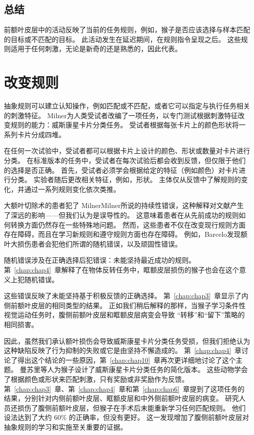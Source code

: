 \subsection{总结}
\par
前额叶皮层中的活动反映了当前的任务规则，例如，猴子是否应该选择与样本匹配的目标或不匹配的目标。
此活动发生在延迟期间，在规则指令呈现之后。
这些规则适用于任何刺激，无论是新奇的还是熟悉的，因此代表。



\section{改变规则}
\par
抽象规则可以建立认知操作，例如匹配或不匹配，或者它可以指定与执行任务相关的刺激特征。 
Milner\cite{milner1963effects}为人类受试者改编了一项任务，以专门测试根据刺激特征改变规则的能力：威斯康星卡片分类任务。 
受试者根据每张卡片上的颜色形状将一系列卡片分成四堆。
\par


在任何一次试验中，受试者都可以根据卡片上设计的颜色、形状或数量对卡片进行分类。 
在标准版本的任务中，受试者在每次试验后都会收到反馈，但仅限于他们的选择是否正确。 
首先，受试者必须学会根据给定的特征（例如颜色）对卡片进行分类。 
实验者随后更改相关特征，例如，形状。 
主体仅从反馈中了解规则的变化，并通过一系列规则变化依次类推。
\par


大额叶切除术的患者犯了 MilnerMilner\cite{milner1963effects}所说的持续性错误，这种解释对文献产生了深远的影响——但我们认为是误导性的。 
这意味着患者在从先前成功的规则如何转换方面仍然存在一些特殊地问题。 
然而，这些患者不仅在改变现行规则方面存在障碍，而且在学习新规则和遵守规则方面也存在障碍。 
例如，Barcelo\cite{barcelo2002both}发现额叶大损伤患者会犯他们所谓的随机错误，以及顽固性错误。
\par


随机错误涉及在正确选择后犯错误：未能坚持最近成功的规则。 
第~\ref{chap:chap4}~章解释了在物体反转任务中，眶额皮层损伤的猴子也会在这个意义上犯随机错误\cite{rudebeck2008frontal}。
\par


这些错误反映了未能坚持基于积极反馈的正确选择。
第~\ref{chap:chap3}~章显示了内侧前额叶皮层的相同类型的结果。 
正如我们稍后解释的那样，当猴子学习条件性视觉运动任务时，腹侧前额叶皮层和眶额皮层病变会导致
“转移”和“留下”策略的相同损害\cite{bussey2001role}。
\par


因此，虽然我们承认额叶损伤会导致威斯康星卡片分类任务受损，但我们拒绝认为这种缺陷反映了行为抑制的失败或它是由坚持不懈造成的。 
第~\ref{chap:chap4}~章讨论了得出这个结论的一些原因，第~\ref{chap:chap10}~章再次更详细地讨论了这个主题。 
曼苏里等人\cite{mansouri2006prefrontal}为猴子设计了威斯康星卡片分类任务的简化版本。 
这些动物学会了根据颜色或形状来匹配刺激，只有奖励或非奖励作为反馈。 
第~\ref{chap:chap3}~章、第~\ref{chap:chap4}~章和第~\ref{chap:chap6}~章提到了这项任务的结果，分别针对内侧前额叶皮层、眶额皮层和中外侧前额叶皮层的病变\cite{buckley2009dissociable}。
研究人员还损伤了腹侧前额叶皮层，但猴子在手术后未能重新学习任何匹配规则。
他们设法达到了大约 60\% 的正确率，但没有更好。
这一发现增加了腹侧前额叶皮层对抽象规则的学习和实施至关重要的证据。
\par



